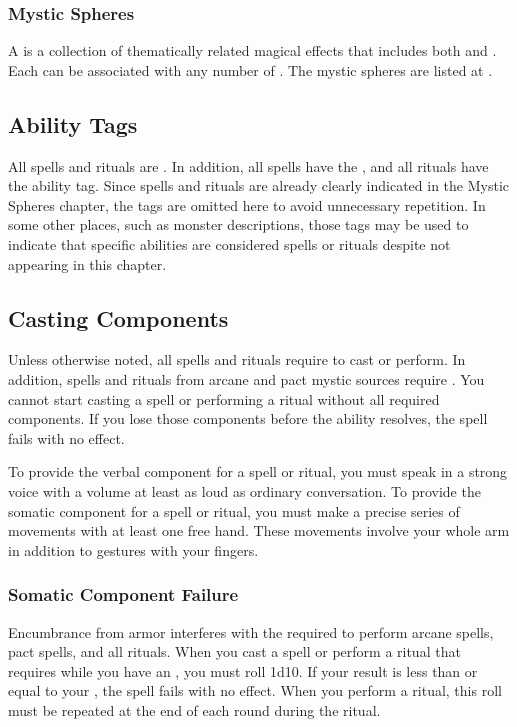         \subsubsection{Mystic Spheres}
            A  is a collection of thematically related magical effects that includes both  and .
            Each  can be associated with any number of .
            The mystic spheres are listed at .

    \subsection{Ability Tags}
        All spells and rituals are \magical.
        In addition, all spells have the  , and all rituals have the  ability tag.
        Since spells and rituals are already clearly indicated in the Mystic Spheres chapter, the tags are omitted here to avoid unnecessary repetition.
        In some other places, such as monster descriptions, those tags may be used to indicate that specific abilities are considered spells or rituals despite not appearing in this chapter.

    \subsection{Casting Components}\label{Casting Components}
        Unless otherwise noted, all spells and rituals require  to cast or perform.
        In addition, spells and rituals from arcane and pact mystic sources require .
        You cannot start casting a spell or performing a ritual without all required components.
        If you lose those components before the ability resolves, the spell fails with no effect.

        To provide the verbal component for a spell or ritual, you must speak in a strong voice with a volume at least as loud as ordinary conversation.
        To provide the somatic component for a spell or ritual, you must make a precise series of movements with at least one free hand.
        These movements involve your whole arm in addition to gestures with your fingers.

        \subsubsection{Somatic Component Failure}\label{Somatic Component Failure}
            Encumbrance from armor interferes with the  required to perform arcane spells, pact spells, and all rituals.
            When you cast a spell or perform a ritual that requires  while you have an , you must roll 1d10.
            If your result is less than or equal to your , the spell fails with no effect.
            When you perform a ritual, this roll must be repeated at the end of each round during the ritual.

